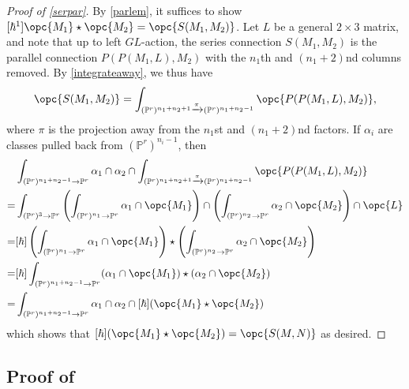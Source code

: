 \documentclass[12pt]{amsart}
\newcommand{\mb}{\mathbb}
\theoremstyle{plain}
\theoremstyle{definition}
\theoremstyle{remark}
\begin{document}
\begin{proof}[Proof of \cref{serpar}]
By \cref{parlem}, it suffices to show $[\hbar^1]\opc{M_1} \star \opc{M_2}=\opc{S(M_1,M_2)}$. Let $L$ be a general $2\times 3$ matrix, and note that
up to left $GL$-action, the series connection $S(M_1, M_2)$ is the parallel connection $P(P(M_1, L), M_2)$ with the $n_1$th and $(n_1 + 2)$nd columns removed. By \cref{integrateaway}, we thus have \[\opc{S(M_1,M_2)}=\int_{(\mb{P}^r)^{n_1 + n_2 + 1} \xrightarrow{\pi} (\mb{P}^r)^{n_1 + n_2 - 1}}\opc{P(P(M_1,L),M_2)},\] where $\pi$ is the projection away from the $n_1$st and $(n_1 + 2)$nd factors. If $\alpha_i$ are classes pulled back from $(\mb{P}^r)^{n_i-1}$, then
\begin{align*}
&\int_{(\mb{P}^r)^{n_1+n_2-1}\to \mb{P}^r}\alpha_1 \cap \alpha_2 \cap \int_{(\mb{P}^r)^{n_1 + n_2 + 1} \xrightarrow{\pi} (\mb{P}^r)^{n_1 + n_2 - 1}}  \opc{P(P(M_1,L),M_2)} \\
=&\int_{(\mb{P}^r)^3 \to \mb{P}^r}\left(\int_{(\mb{P}^r)^{n_1}\to \mb{P}^r}\alpha_1\cap\opc{M_1}\right) \cap \left(\int_{(\mb{P}^r)^{n_2}\to \mb{P}^r}\alpha_2\cap\opc{M_2}\right) \cap \opc{L}\\
=&[\hbar]\left(\int_{(\mb{P}^r)^{n_1}\to \mb{P}^r}\alpha_1 \cap \opc{M_1}\right)\star\left(\int_{(\mb{P}^r)^{n_2}\to \mb{P}^r}\alpha_2\cap\opc{M_2}\right)\\
=&[\hbar]\int_{(\mb{P}^r)^{n_1+n_2-1}\to \mb{P}^r} (\alpha_1 \cap \opc{M_1}) \star (\alpha_2 \cap \opc{M_2})\\
=&\int_{(\mb{P}^r)^{n_1+n_2-1}\to \mb{P}^r} \alpha_1 \cap \alpha_2 \cap [\hbar](\opc{M_1}\star \opc{M_2})
\end{align*}
which shows that $[\hbar](\opc{M_1}\star\opc{M_2})=\opc{S(M,N)}$ as desired.
\end{proof}

\subsection{Proof of }
\end{document}
